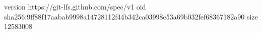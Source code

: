version https://git-lfs.github.com/spec/v1
oid sha256:9ff88f17aabab9998a14728112f44b342ca03998c53a69b032fef68367182a90
size 12583008
